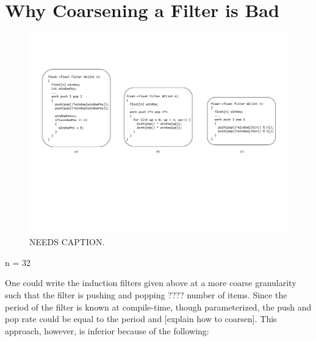 \section{Why Coarsening a Filter is Bad}
\label{sec:coarsen}







\begin{figure}[t!]
\centering
\includegraphics[width=6.5in]{figures/weights-calc-example.pdf}
\caption{NEEDS CAPTION.\protect\label{fig:wc-example}}
\end{figure}


n = 32

One could write the induction filters given above at a more coarse granularity
such that the filter is pushing and popping ???? number of items.
Since the period of the filter is known at compile-time, though
parameterized, the push and pop rate could be equal to the period and
[explain how to coarsen].  This approach, however, is inferior because
of the following:

